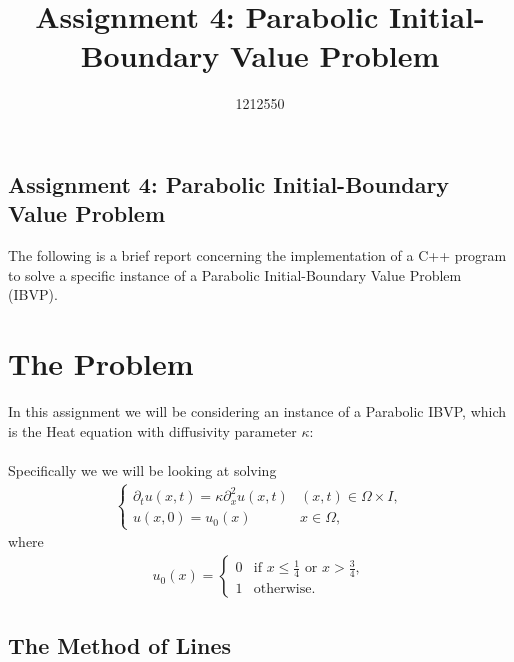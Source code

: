 \documentclass[10pt]{article}
\begin{document}
\title{Assignment 4:  Parabolic Initial-Boundary Value Problem}
\author{1212550}
\begin{center}
\section*{Assignment 4:  Parabolic Initial-Boundary Value Problem}


The following is a brief report concerning the implementation of a C++ program to solve a specific instance of a Parabolic Initial-Boundary Value Problem (IBVP).\\
\end{center}

\section{The Problem}


In this assignment we will be considering an instance of a Parabolic IBVP, which is the Heat equation with diffusivity parameter $\kappa$:\\

\noindent{}\\

Specifically we we will be looking at solving
\begin{align*}
\begin{cases}
\partial_t u(x,t) = \kappa \partial_x^2 u(x,t) & (x,t) \in \Omega \times I, \\
u(x,0) = u_0(x) & x \in \Omega,
\end{cases}
\end{align*}
 where
\begin{align*}
u_0(x) =
\begin{cases}
0 & \text{if } x \leq \frac{1}{4} \text{ or } x > \frac{3}{4}, \\
1 & \text{otherwise}.
\end{cases}
\end{align*}

\subsection{The Method of Lines}
\end{document}
